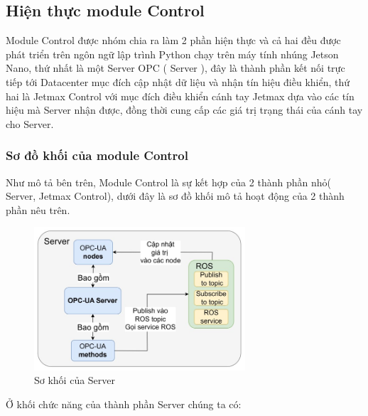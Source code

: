 \subsection{Hiện thực module Control}
Module Control được nhóm chia ra làm 2 phần hiện thực và cả hai đều được phát triển trên ngôn ngữ lập trình Python chạy trên máy tính nhúng Jetson Nano, thứ nhất là một Server OPC ( Server ), đây là thành phần kết nối trực tiếp tới Datacenter mục đích cập nhật dữ liệu và nhận tín hiệu điều khiển, thứ hai là Jetmax Control với mục đích điều khiển cánh tay Jetmax dựa vào các tín hiệu mà Server nhận được, đồng thời cung cấp các giá trị trạng thái của cánh tay cho Server.
\subsubsection{Sơ đồ khối của module Control}
Như mô tả bên trên, Module Control là sự kết hợp của 2 thành phần nhỏ( Server, Jetmax Control), dưới đây là sơ đồ khối mô tả hoạt động của 2 thành phần nêu trên.
\begin{figure}[!h]
    \centering
    \includegraphics[width=0.7\textwidth]{Images/Implementation/Control/Server_block.jpg}
    \caption{Sơ khối của Server}
\end{figure}
Ở khối chức năng của thành phần Server chúng ta có:
